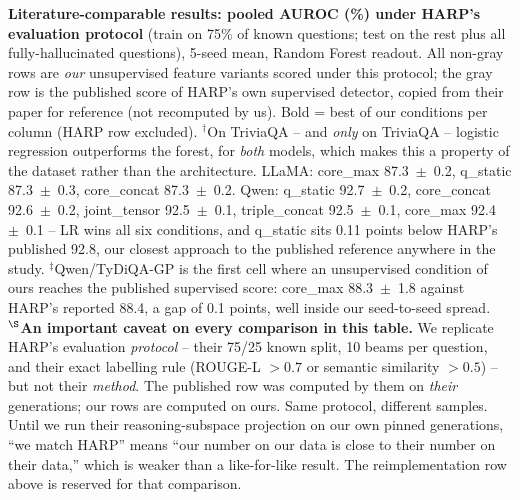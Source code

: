 \documentclass[11pt,a4paper]{article}
\begin{document}
\begin{table}[h]
\caption{\textbf{Literature-comparable results: pooled AUROC (\%) under HARP's evaluation
protocol} (train on 75\% of known questions; test on the rest plus all fully-hallucinated
questions), 5-seed mean, Random Forest readout. All non-gray rows are \emph{our}
unsupervised feature variants scored under this protocol; the gray row is the published
score of HARP's own supervised detector, copied from their paper for reference (not
recomputed by us). Bold = best of our conditions per column (HARP row excluded).
$^{\dagger}$On TriviaQA -- and \emph{only} on TriviaQA -- logistic regression outperforms the
forest, for \emph{both} models, which makes this a property of the dataset rather than the
architecture. LLaMA: core\_max 87.3~$\pm$~0.2, q\_static 87.3~$\pm$~0.3, core\_concat
87.3~$\pm$~0.2. Qwen: q\_static 92.7~$\pm$~0.2, core\_concat 92.6~$\pm$~0.2, joint\_tensor
92.5~$\pm$~0.1, triple\_concat 92.5~$\pm$~0.1, core\_max 92.4~$\pm$~0.1 -- LR wins all six
conditions, and q\_static sits 0.11 points below HARP's published 92.8, our closest approach to
the published reference anywhere in the study. $^{\ddagger}$Qwen/TyDiQA-GP is the
first cell where an unsupervised condition of ours reaches the published supervised score:
core\_max 88.3~$\pm$~1.8 against HARP's reported 88.4, a gap of 0.1 points, well inside our
seed-to-seed spread.
\\[2pt]
$^{\S}$\textbf{An important caveat on every comparison in this table.} We replicate HARP's
evaluation \emph{protocol} -- their 75/25 known split, 10 beams per question, and their exact
labelling rule (ROUGE-L $>0.7$ or semantic similarity $>0.5$) -- but not their \emph{method}. The
published row was computed by them on \emph{their} generations; our rows are computed on ours.
Same protocol, different samples. Until we run their reasoning-subspace projection on our own
pinned generations, ``we match HARP'' means ``our number on our data is close to their number on
their data,'' which is weaker than a like-for-like result. The reimplementation row above is
reserved for that comparison.}
\end{table}
\end{document}
